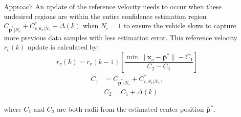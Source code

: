\begin{section}{Approach}
An update of the reference velocity needs to occur when these undesired regions are within the entire confidence estimation region $ C_{\bar{\bm{p}}^*|N_e} +C_{v,\theta_h|N_e}^{*}+\Delta(k)$ when $N_e=1$ to ensure the vehicle slows to capture more previous data samples with less estimation error. This reference velocity $r_v(k)$ update is calculated by:
    \begin{equation}
	    r_v(k)=r_v(k-1) \left[ \frac{ \min \lVert \bm{x}_o - \bar{\bm{p}}^* \rVert - C_1}{C_2 - C_1} \right]
	\end{equation}
	\begin{equation}
	\begin{split}
	    C_1&=C_{\bar{\bm{p}}^*|N_e} +C_{v,\theta_h|N_e}^{*},\\ &C_2=C_1+\Delta(k) \nonumber	    
	\end{split}
	\end{equation}
	
where $C_1$ and $C_2$ are both radii from the estimated center position $\bar{\bm{p}}^*$.
	







\end{section} 